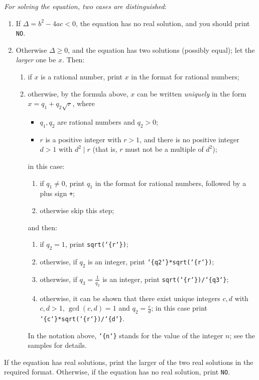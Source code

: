 \documentclass[11pt]{article}
\newcommand{\lbr}{\char`\{}
\newcommand{\rbr}{\char`\}}
\begin{document}
\emph{For solving the equation, two cases are distinguished}:
\begin{enumerate}
\item If $\Delta = b^2 - 4ac < 0$, the equation has no real solution,
  and you should print \texttt{NO}.
\item Otherwise $\Delta \ge 0$, and the equation has two solutions
  (possibly equal); let the \emph{larger} one be $x$. Then:
  \begin{enumerate}
  \item[(1)] if $x$ is a rational number, print $x$ in the format for
    rational numbers;
  \item[(2)] otherwise, by the formula above, $x$ can be written
    \emph{uniquely} in the form $x = q_1 + q_2 \sqrt{r}$, where
    \begin{itemize}
    \item $q_1, q_2$ are rational numbers and $q_2 > 0$;
    \item $r$ is a positive integer with $r > 1$, and there is no positive
      integer $d > 1$ with $d^2 \mid r$ (that is, $r$ must not be a
      multiple of $d^2$);
    \end{itemize}
    in this case:
    \begin{enumerate}
    \item if $q_1 \ne 0$, print $q_1$ in the format for rational numbers,
      followed by a plus sign \texttt{+};
    \item otherwise skip this step;
    \end{enumerate}
    and then:
    \begin{enumerate}
    \item if $q_2 = 1$, print \texttt{sqrt(\lbr{}r\rbr{})};
    \item otherwise, if $q_2$ is an integer, print
      \texttt{\lbr{}q2\rbr{}*sqrt(\lbr{}r\rbr{})};
    \item otherwise, if $q_3 = \frac{1}{q_2}$ is an integer, print
      \texttt{sqrt(\lbr{}r\rbr{})/\lbr{}q3\rbr{}};
    \item otherwise, it can be shown that there exist unique integers
      $c, d$ with $c, d > 1$, $\gcd(c, d) = 1$ and $q_2 = \frac{c}{d}$;
      in this case print
      \texttt{\lbr{}c\rbr{}*sqrt(\lbr{}r\rbr{})/\lbr{}d\rbr{}}.
    \end{enumerate}
    In the notation above, \texttt{\lbr{}n\rbr{}} stands for the value of the
    integer $n$; see the samples for details.
  \end{enumerate}
\end{enumerate}
If the equation has real solutions, print the larger of the two real
solutions in the required format.
Otherwise, if the equation has no real solution, print \texttt{NO}.
\end{document}
